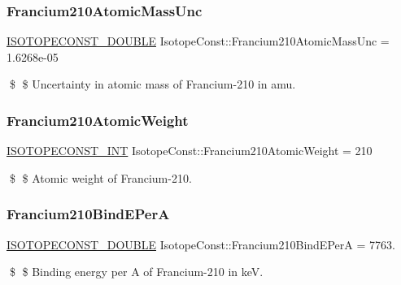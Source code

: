 \subsubsection{\texorpdfstring{Francium210\+Atomic\+Mass\+Unc}{Francium210AtomicMassUnc}}
{\footnotesize\ttfamily \mbox{\hyperlink{group___isotope_const-_macros_ga8f45a7272ce02c0b4c65c44636ed719a}{I\+S\+O\+T\+O\+P\+E\+C\+O\+N\+S\+T\+\_\+\+D\+O\+U\+B\+LE}} Isotope\+Const\+::\+Francium210\+Atomic\+Mass\+Unc = 1.\+6268e-\/05}

\$ \$ Uncertainty in atomic mass of Francium-\/210 in amu. \mbox{\label{group___isotope_const-_francium-_fr210_ga07bb3d4b630cd1862f03fe0908053994}} 
\subsubsection{\texorpdfstring{Francium210\+Atomic\+Weight}{Francium210AtomicWeight}}
{\footnotesize\ttfamily \mbox{\hyperlink{group___isotope_const-_macros_ga5f18360b3e99483a35c32d789e62621c}{I\+S\+O\+T\+O\+P\+E\+C\+O\+N\+S\+T\+\_\+\+I\+NT}} Isotope\+Const\+::\+Francium210\+Atomic\+Weight = 210}

\$ \$ Atomic weight of Francium-\/210. \mbox{\label{group___isotope_const-_francium-_fr210_ga35651981661a32a857f93b902d8efbef}} 
\subsubsection{\texorpdfstring{Francium210\+Bind\+E\+PerA}{Francium210BindEPerA}}
{\footnotesize\ttfamily \mbox{\hyperlink{group___isotope_const-_macros_ga8f45a7272ce02c0b4c65c44636ed719a}{I\+S\+O\+T\+O\+P\+E\+C\+O\+N\+S\+T\+\_\+\+D\+O\+U\+B\+LE}} Isotope\+Const\+::\+Francium210\+Bind\+E\+PerA = 7763.}

\$ \$ Binding energy per A of Francium-\/210 in keV. \mbox{\label{group___isotope_const-_francium-_fr210_ga4130a48e79d746e18b256fb4ceec2834}} 
